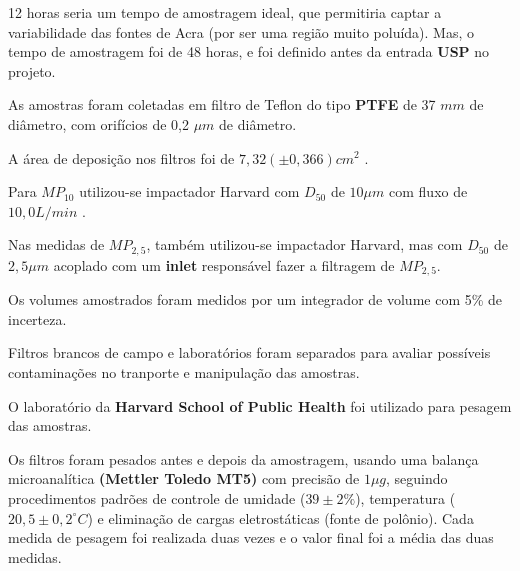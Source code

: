 12 horas seria um tempo de amostragem ideal, que permitiria captar 
a variabilidade das fontes de Acra (por ser uma região muito poluída).
Mas, o tempo de amostragem foi de 48 horas, e foi definido antes da 
entrada \textbf{USP} no projeto.

As amostras  foram coletadas em filtro de Teflon do tipo 
\textbf{PTFE} de 37 $mm$ de diâmetro, com orifícios de 0,2 $\mu m$ de diâmetro. 

A área de deposição nos filtros foi de $7,32 (\pm 0,366) cm^2$ .

Para $MP_{10}$ utilizou-se impactador Harvard com $D_{50}$ de $10 \mu m$ 
com fluxo de $10,0 L/min$ \citep{marple1987}. 

Nas medidas de $MP_{2,5}$, também utilizou-se impactador Harvard, 
mas com $D_{50}$ de $2,5 \mu m$ acoplado com um \textbf{inlet} 
responsável fazer a filtragem de $MP_{2,5}$.

Os volumes amostrados foram medidos por um integrador de volume
com 5\% de incerteza.

Filtros brancos de campo e laboratórios foram separados para avaliar 
possíveis contaminações no tranporte e manipulação das amostras. 

O laboratório da \textbf{Harvard School of Public Health} foi
utilizado para pesagem das amostras.

Os filtros foram pesados antes e depois da amostragem, usando uma balança 
microanalítica \textbf{(Mettler Toledo MT5)} com precisão de $1 \mu g$, 
seguindo procedimentos padrões de controle de umidade ($39 \pm 2 \%$), 
temperatura ($20,5 \pm 0,2 ^{\circ} C$) e eliminação de cargas eletrostáticas 
(fonte de polônio). 
Cada medida de pesagem foi realizada duas vezes e o valor final foi a média das 
duas medidas. 
